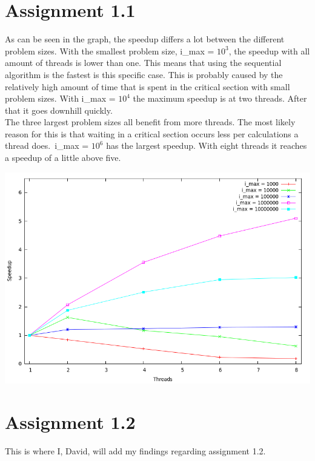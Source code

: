 \documentclass[12pt]{article}
\begin{document}
\maketitle
\section{Assignment 1.1}

As can be seen in the graph, the speedup differs a lot between the different
problem sizes. With the smallest problem size, i\_max = $10^3$, the speedup
with all amount of threads is lower than one. This means that using the
sequential algorithm  is the fastest is this specific case. This is probably
caused by the relatively high amount of time that is spent in the critical
section with small problem sizes. With i\_max = $10^4$ the maximum speedup is at
two threads. After that it goes downhill quickly. \\
The three largest problem sizes all benefit from more threads. The most likely
reason for this is that waiting in a critical section occurs less per
calculations a thread does.\ i\_max = $10^6$ has the largest speedup. With eight
threads it reaches a speedup of a little above five.

\includegraphics[width=\textwidth]{speedupgraph.png}

\section{Assignment 1.2}
This is where I, David, will add my findings regarding assignment 1.2.
\end{document}
